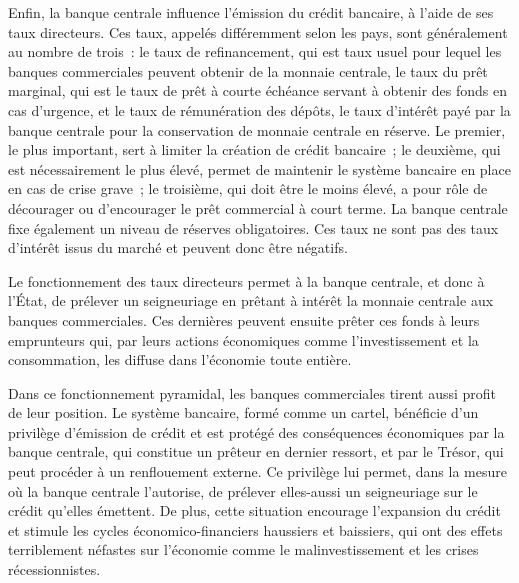 Enfin, la banque centrale influence l'émission du crédit bancaire, à l'aide de ses taux directeurs. Ces taux, appelés différemment selon les pays, sont généralement au nombre de trois~: le taux de refinancement, qui est taux usuel pour lequel les banques commerciales peuvent obtenir de la monnaie centrale, le taux du prêt marginal, qui est le taux de prêt à courte échéance servant à obtenir des fonds en cas d'urgence, et le taux de rémunération des dépôts, le taux d'intérêt payé par la banque centrale pour la conservation de monnaie centrale en réserve. Le premier, le plus important, sert à limiter la création de crédit bancaire~; le deuxième, qui est nécessairement le plus élevé, permet de maintenir le système bancaire en place en cas de crise grave~; le troisième, qui doit être le moins élevé, a pour rôle de décourager ou d'encourager le prêt commercial à court terme. La banque centrale fixe également un niveau de réserves obligatoires. Ces taux ne sont pas des taux d'intérêt issus du marché et peuvent donc être négatifs.


Le fonctionnement des taux directeurs permet à la banque centrale, et donc à l'État, de prélever un seigneuriage en prêtant à intérêt la monnaie centrale aux banques commerciales. Ces dernières peuvent ensuite prêter ces fonds à leurs emprunteurs qui, par leurs actions économiques comme l'investissement et la consommation, les diffuse dans l'économie toute entière.

Dans ce fonctionnement pyramidal, les banques commerciales tirent aussi profit de leur position. Le système bancaire, formé comme un cartel, bénéficie d'un privilège d'émission de crédit et est protégé des conséquences économiques par la banque centrale, qui constitue un prêteur en dernier ressort, et par le Trésor, qui peut procéder à un renflouement externe. Ce privilège lui permet, dans la mesure où la banque centrale l'autorise, de prélever elles-aussi un seigneuriage sur le crédit qu'elles émettent. De plus, cette situation encourage l'expansion du crédit et stimule les cycles économico-financiers haussiers et baissiers, qui ont des effets terriblement néfastes sur l'économie comme le malinvestissement et les crises récessionnistes.


